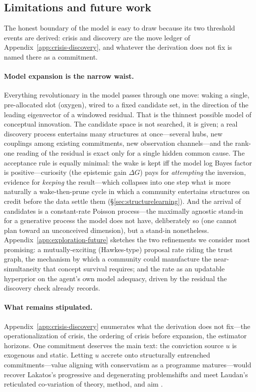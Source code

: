 \documentclass[11pt]{article}
\begin{document}
\subsection{Limitations and future work}
\label{sec:res-staircase}

The honest boundary of the model is easy to draw because its two threshold events are derived:
crisis and discovery are the move ledger of Appendix~\ref{app:crisis-discovery}, and whatever the
derivation does not fix is named there as a commitment.

\paragraph{Model expansion is the narrow waist.}
Everything revolutionary in the model passes through one move: waking a single, pre-allocated slot
(oxygen), wired to a fixed candidate set, in the direction of the leading eigenvector of a
windowed residual. That is the thinnest possible model of conceptual innovation. The candidate
space is not searched, it is given; a real discovery process entertains many structures at
once---several hubs, new couplings among existing commitments, new observation channels---and the
rank-one reading of the residual is exact only for a single hidden common cause. The acceptance
rule is equally minimal: the wake is kept iff the model log Bayes factor is positive---curiosity
(the epistemic gain $\Delta G$) pays for \emph{attempting} the inversion, evidence for
\emph{keeping} the result---which collapses into one step what is more naturally a wake-then-prune
cycle in which a community entertains structures on credit before the data settle them
(\S\ref{sec:structurelearning}). And the arrival of candidates is a constant-rate Poisson
process---the maximally agnostic stand-in for a generative process the model does not have,
deliberately so (one cannot plan toward an unconceived dimension), but a stand-in nonetheless.
Appendix~\ref{app:exploration-future} sketches the two refinements we consider most promising: a
mutually-exciting (Hawkes-type) proposal rate riding the trust graph, the mechanism by which a
community could manufacture the near-simultaneity that concept survival requires; and the rate as
an updatable hyperprior on the agent's own model adequacy, driven by the residual the discovery
check already records.

\paragraph{What remains stipulated.}
Appendix~\ref{app:crisis-discovery} enumerates what the derivation does not fix---the
operationalization of crisis, the ordering of crisis before expansion, the estimator horizons. One
commitment deserves the main text: the conviction source $u$ is exogenous and static. Letting $u$
accrete onto structurally entrenched commitments---value aligning with conservatism as a programme
matures---would recover Lakatos's progressive and degenerating problemshifts and meet Laudan's
reticulated co-variation of theory, method, and aim \citep{lakatos1970,laudan1984}.
\end{document}
